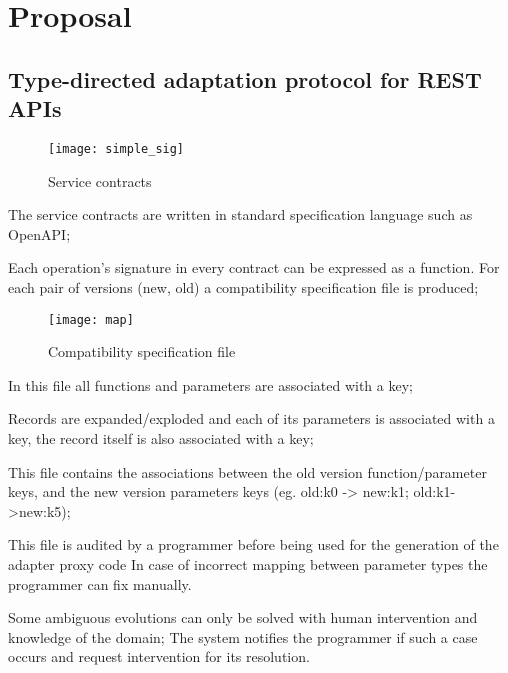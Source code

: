 
%

\chapter{Proposal}
\label{cha:proposal}

\section{Type-directed adaptation protocol for REST APIs} %
\label{sec:type-directed_adaptation_protocol_for_REST_APIs}

\begin{figure}[htbp]
    \centering
    \texttt{[image: simple\_sig]}
    \caption{Service contracts}
    \label{fig:simple}
\end{figure}

The service contracts are written in standard specification language such as OpenAPI;

Each operation's signature in every contract can be expressed as a function.
For each pair of versions (new, old) a compatibility specification file is produced;

\begin{figure}[htbp]
    \centering
    \texttt{[image: map]}
    \caption{Compatibility specification file}
    \label{fig:map}
\end{figure}

In this file all functions and parameters are associated with a key;

Records are expanded/exploded and each of its parameters is associated with a key, the record itself is also associated with a key;

This file contains the associations between the old version function/parameter keys, and the new version parameters keys (eg. old:k0 -> new:k1; old:k1->new:k5);

This file is audited by a programmer before being used for the generation of the adapter proxy code
In case of incorrect mapping between parameter types the programmer can fix manually.

Some ambiguous evolutions can only be solved with human intervention and knowledge of the domain;
The system notifies the programmer if such a case occurs and request intervention for its resolution.

